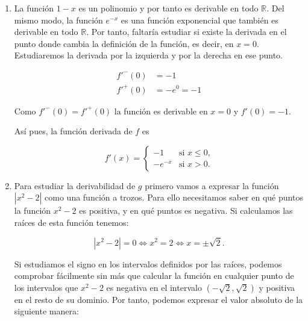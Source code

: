 \documentclass[
  spanish,
  a4paper,
]{scrreport}
\theoremstyle{definition}
\theoremstyle{remark}
\begin{document}
\begin{tcolorbox}[enhanced jigsaw, arc=.35mm, bottomrule=.15mm, bottomtitle=1mm, breakable, colback=white, colbacktitle=quarto-callout-tip-color!10!white, colframe=quarto-callout-tip-color-frame, coltitle=black, left=2mm, leftrule=.75mm, opacityback=0, opacitybacktitle=0.6, rightrule=.15mm, title=\textcolor{quarto-callout-tip-color}{\faLightbulb}\hspace{0.5em}{Solución}, titlerule=0mm, toprule=.15mm, toptitle=1mm]

\begin{enumerate}
\def\labelenumi{\alph{enumi}.}
\item
  La función \(1-x\) es un polinomio y por tanto es derivable en todo
  \(\mathbb{R}\). Del mismo modo, la función \(e^{-x}\) es una función
  exponencial que también es derivable en todo \(\mathbb{R}\). Por
  tanto, faltaría estudiar si existe la derivada en el punto donde
  cambia la definición de la función, es decir, en \(x=0\). Estudiaremos
  la derivada por la izquierda y por la derecha en ese punto.

  \begin{align*}
   f'^-(0) &= -1\\
   f'^+(0) &= -e^0 = -1
   \end{align*}

  Como \(f'^-(0)= f'^+(0)\) la función es derivable en \(x=0\) y
  \(f'(0)=-1\).

  Así pues, la función derivada de \(f\) es

  \[
   f'(x)=
   \begin{cases}
   -1 & \mbox{si $x\leq 0$,} \\
   -e^{-x} & \mbox{si $x>0$.}
   \end{cases}
   \]
\item
  Para estudiar la derivabilidad de \(g\) primero vamos a expresar la
  función \(|x^2-2|\) como una función a trozos. Para ello necesitamos
  saber en qué puntos la función \(x^2-2\) es positiva, y en qué puntos
  es negativa. Si calculamos las raíces de esta función tenemos:

  \[
   |x^2-2| = 0 \Leftrightarrow x^2 = 2 \Leftrightarrow x = \pm \sqrt 2.
   \]

  Si estudiamos el signo en los intervalos definidos por las raíces,
  podemos comprobar fácilmente sin más que calcular la función en
  cualquier punto de los intervalos que \(x^2-2\) es negativa en el
  intervalo \((-\sqrt 2, \sqrt 2)\) y positiva en el resto de su
  dominio. Por tanto, podemos expresar el valor absoluto de la siguiente
  manera:


\end{enumerate}
\end{tcolorbox}
\end{document}
